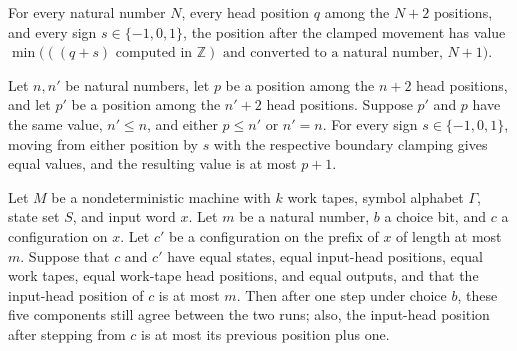 \begin{lemma}
\label{Turing.NDTM.moveInputPos_val}
\leanok
{}
For every natural number $N$, every head position $q$ among the $N+2$ positions, and
every sign $s\in\{-1,0,1\}$, the position after the clamped movement has value
$\min\bigl(((q+s)\text{ computed in }\mathbb{Z})\text{ and converted to a natural
number},\,N+1\bigr)$.
\end{lemma}

\begin{lemma}
\label{Turing.NDTM.moveInputPos_val_take}
\leanok
{}
Let $n,n'$ be natural numbers, let $p$ be a position among the $n+2$ head positions, and
let $p'$ be a position among the $n'+2$ head positions. Suppose $p'$ and $p$ have the
same value, $n'\le n$, and either $p\le n'$ or $n'=n$. For every sign $s\in\{-1,0,1\}$,
moving from either position by $s$ with the respective boundary clamping gives equal
values, and the resulting value is at most $p+1$.
\end{lemma}

\begin{lemma}
\label{Turing.NDTM.stepWith_take_agree}
\leanok
{}
Let $M$ be a nondeterministic machine with $k$ work tapes, symbol alphabet $\Gamma$,
state set $S$, and input word $x$. Let $m$ be a natural number, $b$ a choice bit, and
$c$ a configuration on $x$. Let $c'$ be a configuration on the prefix of $x$ of length
at most $m$. Suppose that $c$ and $c'$ have equal states, equal input-head positions,
equal work tapes, equal work-tape head positions, and equal outputs, and that the
input-head position of $c$ is at most $m$. Then after one step under choice $b$, these
five components still agree between the two runs; also, the input-head position after
stepping from $c$ is at most its previous position plus one.
\end{lemma}

